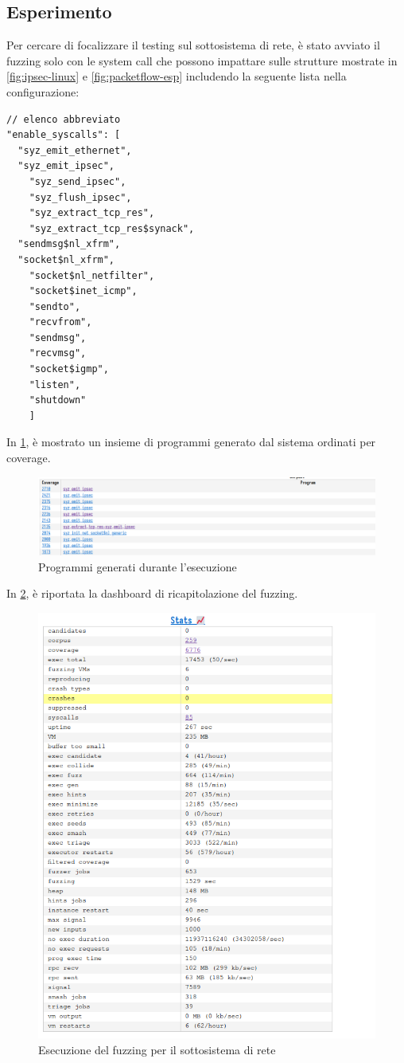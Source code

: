 \documentclass{article}
\begin{document}
\subsection{Esperimento}
Per cercare di focalizzare il testing sul sottosistema di rete, è stato avviato il fuzzing 
solo con le system call che possono impattare sulle strutture mostrate in 
\cref{fig:ipsec-linux} e \cref{fig:packetflow-esp} 
includendo la seguente lista nella configurazione:

\begin{verbatim}
// elenco abbreviato
"enable_syscalls": [
  "syz_emit_ethernet",
  "syz_emit_ipsec",
	"syz_send_ipsec",
	"syz_flush_ipsec",
	"syz_extract_tcp_res",
	"syz_extract_tcp_res$synack",
  "sendmsg$nl_xfrm",
  "socket$nl_xfrm",
	"socket$nl_netfilter",
	"socket$inet_icmp",
	"sendto",
	"recvfrom",
	"sendmsg",
	"recvmsg",
	"socket$igmp",
	"listen",
	"shutdown"
	] 
\end{verbatim}

In \cref{fig:corpus}, è mostrato un 
insieme di programmi generato dal sistema ordinati per coverage.
\begin{figure}[h]
  \begin{center}
    \includegraphics[width=.9\textwidth]{figures/corpus.png}
  \end{center}
  \caption{Programmi generati durante l'esecuzione}\label{fig:corpus}
\end{figure}

In \cref{fig:fuzzing}, è
riportata la dashboard di ricapitolazione del fuzzing.
\begin{figure}[h]
  \begin{center}
    \includegraphics[width=.7\textwidth]{figures/experiment.png}
  \end{center}
  \caption{Esecuzione del fuzzing per il sottosistema di rete}\label{fig:fuzzing}
\end{figure}
\end{document}
